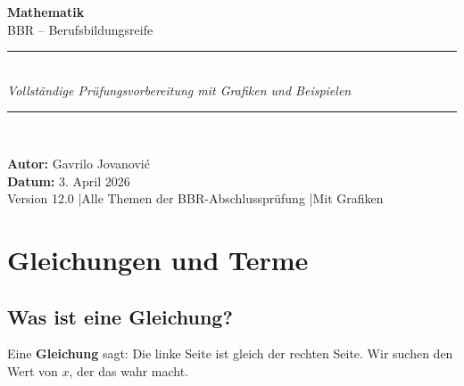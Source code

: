 \documentclass[12pt, a4paper]{article}
\begin{document}
\begin{titlepage}
  \centering
  \vspace*{1.0cm}

  {\fontsize{38}{44}\selectfont\bfseries\color{mainblue} Mathematik}\\[0.3cm]
  {\Large BBR -- Berufsbildungsreife}\\[0.4cm]
  \rule{\linewidth}{0.5pt}\\[0.3cm]
  {\large\itshape Vollst\"andige Pr\"ufungsvorbereitung mit Grafiken und Beispielen}\\
  \rule{\linewidth}{0.5pt}\\[1.2cm]

  \vspace{1.2cm}

  \vspace{1.0cm}
  \textbf{Autor:} Gavrilo Jovanovi\'c\\[0.4cm]
  \textbf{Datum:} 3. April 2026\\[0.4cm]

  \vfill
  {\small Version 12.0 \quad|\quad Alle Themen der BBR-Abschlusspr\"ufung \quad|\quad Mit Grafiken}
\end{titlepage}

\tableofcontents
\newpage

\section{\color{mainblue}Gleichungen und Terme}

\subsection{Was ist eine Gleichung?}

Eine \textbf{Gleichung} sagt: Die linke Seite ist gleich der rechten Seite.
Wir suchen den Wert von $x$, der das wahr macht.
\end{document}
